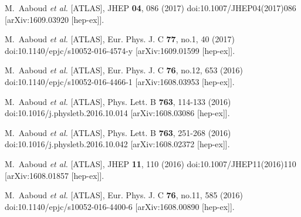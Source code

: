 \begin{thebibliography}{9}
M.~Aaboud \textit{et al.} [ATLAS],
JHEP \textbf{04}, 086 (2017)
doi:10.1007/JHEP04(2017)086
[arXiv:1609.03920 [hep-ex]].

M.~Aaboud \textit{et al.} [ATLAS],
Eur. Phys. J. C \textbf{77}, no.1, 40 (2017)
doi:10.1140/epjc/s10052-016-4574-y
[arXiv:1609.01599 [hep-ex]].

M.~Aaboud \textit{et al.} [ATLAS],
Eur. Phys. J. C \textbf{76}, no.12, 653 (2016)
doi:10.1140/epjc/s10052-016-4466-1
[arXiv:1608.03953 [hep-ex]].

M.~Aaboud \textit{et al.} [ATLAS],
Phys. Lett. B \textbf{763}, 114-133 (2016)
doi:10.1016/j.physletb.2016.10.014
[arXiv:1608.03086 [hep-ex]].

M.~Aaboud \textit{et al.} [ATLAS],
Phys. Lett. B \textbf{763}, 251-268 (2016)
doi:10.1016/j.physletb.2016.10.042
[arXiv:1608.02372 [hep-ex]].

M.~Aaboud \textit{et al.} [ATLAS],
JHEP \textbf{11}, 110 (2016)
doi:10.1007/JHEP11(2016)110
[arXiv:1608.01857 [hep-ex]].

M.~Aaboud \textit{et al.} [ATLAS],
Eur. Phys. J. C \textbf{76}, no.11, 585 (2016)
doi:10.1140/epjc/s10052-016-4400-6
[arXiv:1608.00890 [hep-ex]].


\end{thebibliography}
